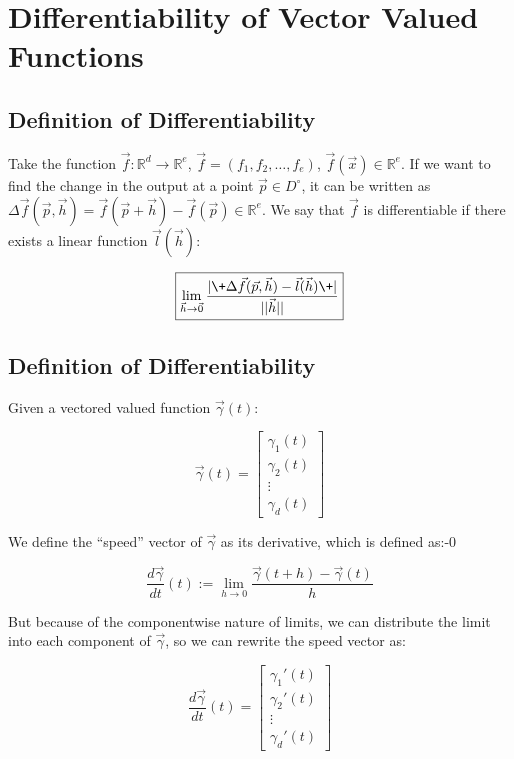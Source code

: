 \documentclass[11 pt, twoside]{article}
\begin{document}
\section{Differentiability of Vector Valued Functions}
\subsection{Definition of Differentiability}
Take the function $\vec{f}: \mathbb{R}^d \to \mathbb{R}^e$, $\vec{f} =
(f_1, f_2, \dots, f_e)$, $\vec{f}(\vec{x}) \in \mathbb{R}^e$. If we
want to find the change in the output at a point $\vec{p} \in D^\circ$, it can
be written as $\Delta \vec{f}(\vec{p}, \vec{h}) =
\vec{f}(\vec{p} + \vec{h}) - \vec{f}(\vec{p}) \in \mathbb{R}^e$. We say that
$\vec{f}$ is differentiable if there exists a linear function $\vec{l}(\vec{h})$:

$$\boxed{\lim_{\vec{h}\to \vec{0}} \frac{|\+\Delta \vec{f}(\vec{p}, \vec{h}) -
\vec{l}(\vec{h})\+|}{||\vec{h}||}}$$

\subsection{Definition of Differentiability}
Given a vectored valued function $\vec{\gamma}(t)$:

\begin{equation*}
    \vec{\gamma}(t) = \left[
    \begin{array}{c}
        \gamma_1 (t)\\
        \gamma_2 (t)\\
        \vdots\\
        \gamma_d (t)
    \end{array} \right]
\end{equation*}

We define the ``speed'' vector of $\vec{\gamma}$ as its derivative, which is
defined as:-0

$$\frac{d\vec{\gamma}}{dt}(t) := \lim_{h\to0} \frac{\vec{\gamma}(t + h) - \vec{\gamma}(t)}{h}$$

But because of the componentwise nature of limits, we can distribute the limit
into each component of $\vec{\gamma}$, so we can rewrite the speed vector as:

\begin{equation*}
    \frac{d\vec{\gamma}}{dt}(t) = \left[
    \begin{array}{c}
        \gamma_1' (t)\\
        \gamma_2' (t)\\
        \vdots\\
        \gamma_d' (t)
    \end{array} \right]
\end{equation*}
\end{document}
